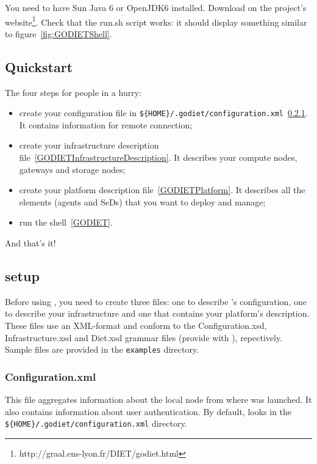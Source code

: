 You need to have Sun Java 6 or OpenJDK6 installed.
Download \godiet on the project's website\footnote{http://graal.ens-lyon.fr/DIET/godiet.html}.
Check that the run.sh script works: it should display something similar to figure~\ref{fig:GODIETShell}.


\subsection{Quickstart}
The four steps for people in a hurry:
\begin{itemize}
\item create your \godiet configuration file in \verb+${HOME}/.godiet/configuration.xml+~\ref{GODIETConfiguration}. It contains information for remote connection;
\item create your infrastructure description file~\ref{GODIETInfrastructureDescription}. It describes your compute nodes, gateways and storage nodes;
\item create your \diet platform description file~\ref{GODIETPlatform}. It describes all the \diet elements (agents and SeDs) that you want to deploy and manage;
\item run the \godiet shell~\ref{GODIET}.
\end{itemize}
And that's it!

\subsection{\godiet setup}

Before using \godiet, you need to create three files: one to describe \godiet's configuration, one to describe your infrastructure and one that contains your \diet platform's description.
These files use an XML-format and conform to the Configuration.xsd, Infrastructure.xsd and Diet.xsd grammar files (provide with \godiet), repectively.
Sample files are provided in the \verb+examples+ directory. 

\subsubsection{Configuration.xml}
\label{GODIETConfiguration}

This file aggregates information about the local node from where \godiet was launched. It also contains information about user authentication.
By default, \godiet looks in the \verb+${HOME}/.godiet/configuration.xml+ directory.

